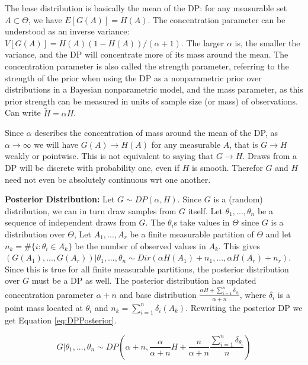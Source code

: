 The base distribution is basically the mean of the DP: for any measurable set $A\subset\Theta$, we have $E[G(A)]=H(A)$. The concentration parameter can be understood as an inverse variance: $V[G(A)]=H(A)(1-H(A))/(\alpha+1)$. The larger $\alpha$ is, the smaller the variance, and the DP will concentrate more of its mass around the mean. The concentration parameter is also called the strength parameter, referring to the strength of the prior when using the DP as a nonparametric prior over distributions in a Bayesian nonparametric model, and the mass parameter, as this prior strength can be measured in units of sample size (or mass) of observations. Can write $\tilde{H}=\alpha H$.

Since $\alpha$ describes the concentration of mass around the mean of the DP, as $\alpha\rightarrow\infty$ we will have $G(A)\rightarrow H(A)$ for any measurable $A$, that is $G\rightarrow H$ weakly or pointwise. This is not equivalent to saying that $G\rightarrow H$. Draws from a DP will be discrete with probability one, even if $H$ is smooth. Therefor $G$ and $H$ need not even be absolutely continuous wrt one another. 

\textbf{Posterior Distribution:} Let $G\sim DP(\alpha,H)$. Since $G$ is a (random) distribution, we can in turn draw samples from $G$ itself. Let $\theta_{1},...,\theta_{n}$ be a sequence of independent draws from $G$. The $\theta_{i}$s take values in $\Theta$ since $G$ is a distribution over $\Theta$, Let $A_{1},...,A_{r}$ be a finite measurable partition of $\Theta$ and let $n_{k}=\#\{i:\theta_{i}\in A_{k}\}$ be the number of observed values in $A_{k}$. This gives $(G(A_{1}),...,G(A_{r}))|\theta_{1},...,\theta_{n}\sim Dir(\alpha H(A_{1})+n_{1},...,\alpha H(A_{r})+n_{r})$.  Since this is true for all finite measurable partitions, the posterior distribution over $G$ must be a DP as well. The posterior distribution has updated concentration parameter $\alpha+n$ and base distribution $\frac{\alpha H+\sum_{i=1}^{n}\delta_{\theta_{i}}}{\alpha+n}$, where $\delta_{i}$ is a point mass located at $\theta_{i}$ and $n_{k}=\sum_{i=1}^{n}\delta_{i}(A_{k})$. Rewriting the posterior DP we get Equation \ref{eq:DPPosterior}.

\begin{equation}
\label{eq:DPPosterior}
G|\theta_{1},...,\theta_{n}\sim DP\left(\alpha+n, \frac{\alpha}{\alpha+n}H+\frac{n}{\alpha+n}\frac{\sum_{i=1}^{n}\delta_{\theta_{i}}}{n}\right)
\end{equation}

